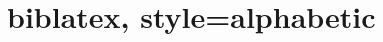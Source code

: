 \documentclass{article}
\begin{document}
\section*{biblatex, style=alphabetic}

\printbibliography
\end{document}
